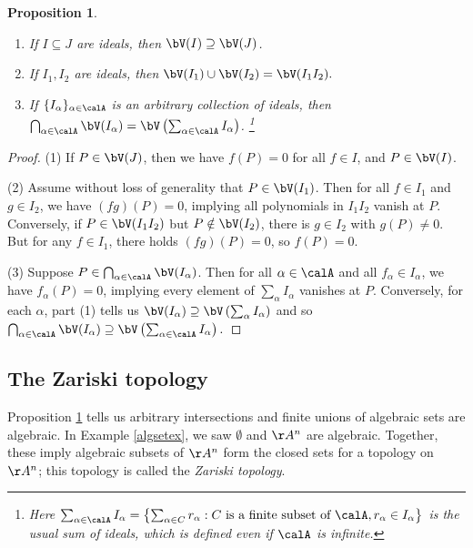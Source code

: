 \documentclass[12pt]{amsart}
\theoremstyle{plain}
\newtheorem{proposition}[theorem]{Proposition}
\begin{document}
\begin{proposition}\label{vproperties}
\begin{enumerate}
\item If $I \subseteq J$ are ideals, then $\bV(I) \supseteq \bV(J)$.
\item If $I_1, I_2$ are ideals, then $\bV(I_1) \cup \bV(I_2) = \bV(I_1 I_2).$
\item If $\{I_\alpha\}_{\alpha \in \calA}$ is an arbitrary collection of ideals, then $\bigcap_{\alpha \in \calA} \bV(I_\alpha) = \bV\left(\sum_{\alpha \in \calA} I_\alpha\right)$.
\footnote{Here $\sum_{\alpha\in\calA} I_\alpha = \left\{\sum_{\alpha \in C} r_\alpha : C \text{ is a finite subset of } \calA, r_\alpha \in I_\alpha \right\}$ is the usual sum of ideals, which is defined even if $\calA$ is infinite.}
\end{enumerate}
\end{proposition}
\begin{proof}
(1) If $P \in \bV(J)$, then we have $f(P)=0$ for all $f \in I$, and $P \in \bV(I)$.

(2) Assume without loss of generality that $P \in \bV(I_1)$.
Then for all $f \in I_1$ and $g \in I_2$, we have $(fg)(P)=0$, implying all polynomials in $I_1 I_2$ vanish at $P$.
Conversely, if $P \in \bV(I_1 I_2)$ but $P \notin \bV(I_2)$, there is $g \in I_2$ with $g(P) \ne 0$.
But for any $f \in I_1$, there holds $(fg)(P)=0$, so $f(P)=0$.

(3) Suppose $P \in \bigcap_{\alpha \in \calA} \bV(I_\alpha)$.
Then for all $\alpha \in \calA$ and all $f_\alpha \in I_\alpha$, we have $f_\alpha(P) = 0$, implying every element of $\sum_{\alpha} I_\alpha$ vanishes at $P$.
Conversely, for each $\alpha$, part (1) tells us $\bV(I_\alpha) \supseteq \bV\left(\sum_{\alpha} I_\alpha\right)$ and so 
$\bigcap_{\alpha\in\calA} \bV(I_\alpha) \supseteq \bV\left(\sum_{\alpha\in\calA} I_\alpha\right).$
\end{proof}

\subsection{The Zariski topology}
Proposition \ref{vproperties} tells us arbitrary intersections and finite unions of algebraic sets are algebraic.
In Example \ref{algsetex}, we saw $\emptyset$ and $\AA^n$ are algebraic.
Together, these imply algebraic subsets of $\AA^n$ form the closed sets for a topology on $\AA^n$; this topology is called the \emph{Zariski topology}.
\end{document}
